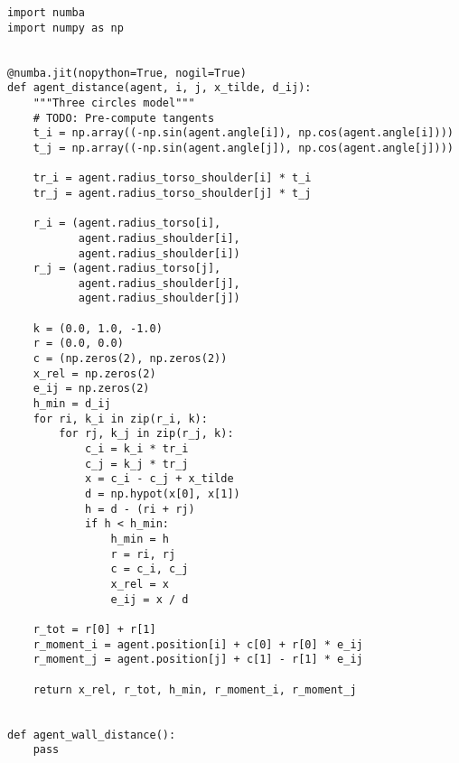 \begin{verbatim}
import numba
import numpy as np


@numba.jit(nopython=True, nogil=True)
def agent_distance(agent, i, j, x_tilde, d_ij):
    """Three circles model"""
    # TODO: Pre-compute tangents
    t_i = np.array((-np.sin(agent.angle[i]), np.cos(agent.angle[i])))
    t_j = np.array((-np.sin(agent.angle[j]), np.cos(agent.angle[j])))

    tr_i = agent.radius_torso_shoulder[i] * t_i
    tr_j = agent.radius_torso_shoulder[j] * t_j

    r_i = (agent.radius_torso[i],
           agent.radius_shoulder[i],
           agent.radius_shoulder[i])
    r_j = (agent.radius_torso[j],
           agent.radius_shoulder[j],
           agent.radius_shoulder[j])

    k = (0.0, 1.0, -1.0)
    r = (0.0, 0.0)
    c = (np.zeros(2), np.zeros(2))
    x_rel = np.zeros(2)
    e_ij = np.zeros(2)
    h_min = d_ij
    for ri, k_i in zip(r_i, k):
        for rj, k_j in zip(r_j, k):
            c_i = k_i * tr_i
            c_j = k_j * tr_j
            x = c_i - c_j + x_tilde
            d = np.hypot(x[0], x[1])
            h = d - (ri + rj)
            if h < h_min:
                h_min = h
                r = ri, rj
                c = c_i, c_j
                x_rel = x
                e_ij = x / d

    r_tot = r[0] + r[1]
    r_moment_i = agent.position[i] + c[0] + r[0] * e_ij
    r_moment_j = agent.position[j] + c[1] - r[1] * e_ij

    return x_rel, r_tot, h_min, r_moment_i, r_moment_j


def agent_wall_distance():
    pass

\end{verbatim}